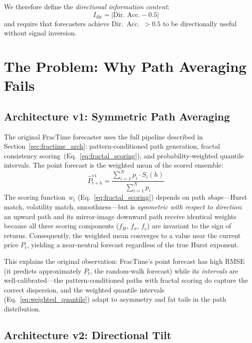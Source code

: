 \documentclass[12pt,a4paper]{article}
\begin{document}
We therefore define the \emph{directional information content}:
\begin{equation}
  I_{\text{dir}} = \bigl|\text{Dir.\ Acc.} - 0.5\bigr|
  \label{eq:dir_info}
\end{equation}
and require that forecasters achieve Dir.\ Acc.\ $> 0.5$ to be
directionally useful without signal inversion.

\section{The Problem: Why Path Averaging Fails}
\label{sec:problem}

\subsection{Architecture v1: Symmetric Path Averaging}

The original FracTime forecaster uses the full pipeline described in
Section~\ref{sec:fractime_arch}: pattern-conditioned path generation,
fractal consistency scoring~(Eq.~\ref{eq:fractal_scoring}), and
probability-weighted quantile intervals.  The point forecast is the
weighted mean of the scored ensemble:
\begin{equation}
  \hat{P}^{\text{v1}}_{t+h} =
    \frac{\sum_{i=1}^N p_i \cdot S_i(h)}{\sum_{i=1}^N p_i}
  \label{eq:v1_forecast}
\end{equation}
The scoring function~$w_i$ (Eq.~\ref{eq:fractal_scoring}) depends on
path \emph{shape}---Hurst match, volatility match, smoothness---but is
\emph{symmetric with respect to direction}: an upward path and its
mirror-image downward path receive identical weights because all three
scoring components ($f_H$, $f_\sigma$, $f_c$) are invariant to the sign
of returns.  Consequently, the weighted mean converges to a value near
the current price $P_t$, yielding a near-neutral forecast regardless of
the true Hurst exponent.

This explains the original observation: FracTime's point forecast has
high RMSE (it predicts approximately $P_t$, the random-walk forecast)
while its \emph{intervals} are well-calibrated---the pattern-conditioned
paths with fractal scoring do capture the correct dispersion, and
the weighted quantile intervals (Eq.~\ref{eq:weighted_quantile}) adapt
to asymmetry and fat tails in the path distribution.

\subsection{Architecture v2: Directional Tilt}
\end{document}

